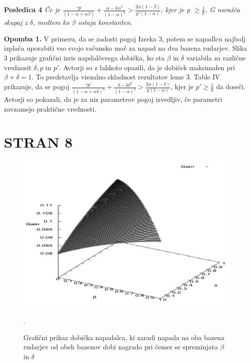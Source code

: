\documentclass{acm_proc_article-sp}
\begin{document}
\newline
\newline
\textbf{Posledica 4} \textit{Če je $\frac{\gamma p}{(1 - \alpha + \alpha\beta)} + \frac{\alpha - k\alpha^2}{(1 - \alpha)^2} > \frac{2\alpha(1 - \beta)}{p' (1 - \alpha)}$, kjer je p $\geq \frac{1}{k}$, G narašča skupaj z $\delta$, medtem ko $\beta$ ostaja konstanten.}

\textbf{Opomba 1.} V primeru, da se zadosti pogoj Izreka 3, potem se napadlcu najbolj izplača uporabiti vso svojo računsko moč za napad na dva bazena rudarjev. Slika 3 prikazuje grafični izris napdalčevega dobička, ko sta $\beta$ in $\delta$ variabila za različne vrednosit $\delta, p $ in $p'$. Avtorji so z lahkoto opazili, da je dobiček maksimalen pri $\beta + \delta = 1$. To predstavlja visualno skladnost rezultatov leme 3.
\newline
\newline
Table IV prikazuje, da se pogoj $\frac{\gamma p'}{(1 - \alpha + \alpha\delta)^2} + \frac{\delta - k\delta^2}{(1 - \alpha)^2} > \frac{2\alpha(1 - \delta)}{p(1 - \alpha)}$, kjer je $p' \geq \frac{1}{k}$ da doseči. Avtorji so pokazali, da je za niz parametrov pogoj izvedljiv, če parametri zavzamejo praktične vrednosti. 

\section{STRAN 8}

\begin{figure}
  \includegraphics[scale=0.25]{image8.png}
  \caption{Grafični prikaz dobička napadalca, ki zaradi napada na oba bazena rudarjev od obeh bazenov dobi nagrado pri čemer se spreminjata $\beta$ in $\delta$}.
  \label{fig:boat1}
\end{figure}
\end{document}
